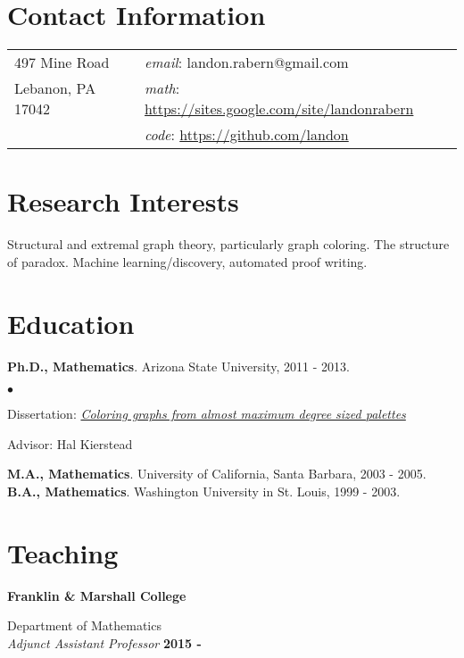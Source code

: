 \documentclass[margin,line]{res}
\newenvironment{list2}{
  \begin{list}{$\bullet$}{%
      \setlength{\itemsep}{0in}
      \setlength{\parsep}{0in} \setlength{\parskip}{0in}
      \setlength{\topsep}{0in} \setlength{\partopsep}{0in} 
      \setlength{\leftmargin}{0.2in}}}{\end{list}}
\begin{document}

\begin{resume}
\section{\sc Contact Information}
\vspace{.05in}
\begin{tabular}{@{}p{2in}p{4in}}     
497 Mine Road & \qquad\qquad\textit{email}: landon.rabern@gmail.com \\   
Lebanon, PA 17042 & \qquad\qquad \textit{math}: \url{https://sites.google.com/site/landonrabern} \\
& \qquad\qquad \textit{code}: \href{https://github.com/landon?tab=repositories}{https://github.com/landon}
\end{tabular}

\section{\sc Research Interests}
Structural and extremal graph theory, particularly graph coloring. The structure of paradox.
Machine learning/discovery, automated proof writing.  %

\bigskip

\section{\sc Education}
{\bf Ph.D., Mathematics}. Arizona State University, 2011 - 2013.
\begin{list2}
\item Dissertation: \textit{\href{https://dl.dropbox.com/u/8609833/Papers/main_fancy.pdf}{Coloring graphs from almost maximum degree sized palettes}}
\item Advisor: Hal Kierstead
\end{list2}
{\bf M.A., Mathematics}. University of California, Santa Barbara, 2003 - 2005.\\
{\bf  B.A., Mathematics}. Washington University in St. Louis, 1999 - 2003.

\section{\sc Teaching}

{\bf Franklin \& Marshall College}

\vspace{-.4cm}
Department of Mathematics\\
{\em Adjunct Assistant Professor} \hfill {\bf 2015 - \phantom{2017}}


\end{resume}
\end{document}

